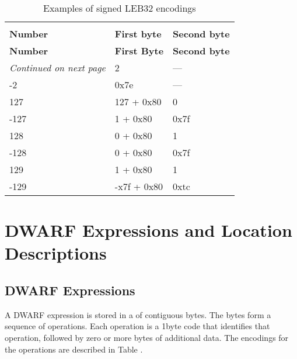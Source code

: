 \begin{centering}
\setlength{\extrarowheight}{0.1cm}
\begin{longtable}{l|l|l}
  \caption{Examples of signed LEB32 encodings} \label{tab:examplesofsignedleb128encodings} \\
  \hline \\ \bfseries Number&\bfseries First byte &\bfseries Second byte \\ \hline
\endfirsthead
  \bfseries Number&\bfseries First Byte &\bfseries Second byte\\ \hline
\endhead
  \hline \emph{Continued on next page}
\endfoot
  \hline
\endlastfoot
2&2& --- \\
-2&0x7e& ---\\
127& 127 + 0x80 & 0 \\
-127& 1 + 0x80 & 0x7f \\
128& 0 + 0x80 & 1 \\
-128& 0 + 0x80 & 0x7f \\
129& 1 + 0x80 & 1 \\
-129& -x7f + 0x80 & 0xtc \\

\end{longtable}
\end{centering}



\section{DWARF Expressions and Location Descriptions}
\label{datarep:dwarfexpressionsandlocationdescriptions}
\subsection{DWARF Expressions}
\label{datarep:dwarfexpressions}

A DWARF expression is stored in a  of contiguous
bytes. The bytes form a sequence of operations. Each operation
is a 1\dash byte code that identifies that operation, followed by
zero or more bytes of additional data. The encodings for the
operations are described in 
Table . 


